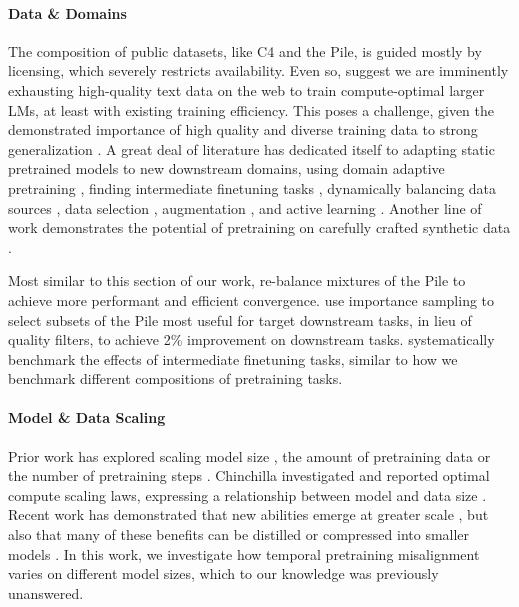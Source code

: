 \documentclass{article}
\begin{document}
\vspace{-3mm}
\paragraph{Data \& Domains}
\label{sec:rw-domains}
The composition of public datasets, like C4 and the Pile, is guided mostly by licensing, which severely restricts availability.
Even so, \citet{villalobos2022will,chinchilla2022implications,hoffmann2022training} suggest we are imminently exhausting high-quality text data on the web to train compute-optimal larger LMs, at least with existing training efficiency.
This poses a challenge, given the demonstrated importance of high quality and diverse training data to strong generalization \citep{gao2020pile,papadimitriou2020learning}.
A great deal of literature has dedicated itself to adapting static pretrained models to new downstream domains, using domain adaptive pretraining \citep{gururangan2020don}, finding intermediate finetuning tasks \citep{pruksachatkun2020intermediate}, dynamically balancing data sources \citep{wang2020balancing}, data selection \citep{iter2021complementarity, albalak2023improving}, augmentation \citep{longpre2019exploration}, and active learning \citep{longpre2022active}.
Another line of work demonstrates the potential of pretraining on carefully crafted synthetic data \citep{wuinsights}.

Most similar to this section of our work, \citet{xie2023doremi} re-balance mixtures of the Pile to achieve more performant and efficient convergence. 
\citet{xie2023data} use importance sampling to select subsets of the Pile most useful for target downstream tasks, in lieu of quality filters, to achieve 2\% improvement on downstream tasks.
\citet{pruksachatkun2020intermediate} systematically benchmark the effects of intermediate finetuning tasks, similar to how we benchmark different compositions of pretraining tasks.

\vspace{-3mm}
\paragraph{Model \& Data Scaling}
\label{sec:rw-scaling}
Prior work has explored scaling model size \citep{kaplan2020scaling,tay2022scaling,du_glam_2021}, the amount of pretraining data or the number of pretraining steps \citep{liu2019roberta,chowdhery2022palm,brown2020language}.
Chinchilla investigated and reported optimal compute scaling laws, expressing a relationship between model and data size \citep{chinchilla2022implications}.
Recent work has demonstrated that new abilities emerge at greater scale \citep{wei2022emergent}, but also that many of these benefits can be distilled or compressed into smaller models \citep{alpaca, movva2022combining}.
In this work, we investigate how temporal pretraining misalignment varies on different model sizes, which to our knowledge was previously unanswered.
\end{document}

